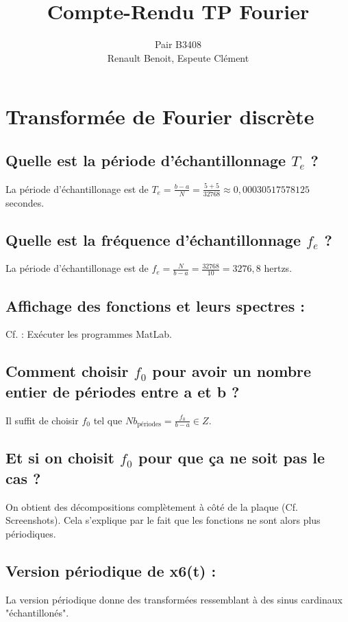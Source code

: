 \documentclass[12pt]{article}
\title{Compte-Rendu TP Fourier}
\author{Pair B3408 \\ {\sc Renault} Benoit, {\sc Espeute} Clément}
\date{}
\begin{document}
\pagestyle{fancy}
\maketitle

\section{Transformée de Fourier discrète}
\subsection{Quelle est la période d'échantillonnage $T_e$ ?}
La période d'échantillonage est de $T_e = \frac{b-a}{N} = \frac{5+5}{32768} \approx{0,00030517578125}$ secondes.

\subsection{Quelle est la fréquence d'échantillonnage $f_e$ ?}
La période d'échantillonage est de $f_e = \frac{N}{b-a} = \frac{32768}{10} = 3276,8$ hertzs.

\subsection{Affichage des fonctions et leurs spectres :}
Cf. : Exécuter les programmes MatLab.

\subsection{Comment choisir $f_0$ pour avoir un nombre entier de périodes entre a et b ?}
Il suffit de choisir $f_0$ tel que $Nb_\text{périodes} = \frac{f_0}{b-a}\in Z$.

\subsection{Et si on choisit $f_0$ pour que ça ne soit pas le cas ?}
On obtient des décompositions complètement à côté de la plaque (Cf. Screenshots). Cela s'explique par le fait que les fonctions ne sont alors plus périodiques.

\subsection{Version périodique de x6(t) :}
La version périodique donne des transformées ressemblant à des sinus cardinaux "échantillonés".
\end{document}
